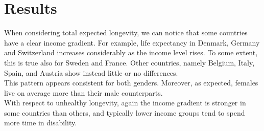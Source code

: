 





\section{Results}



When considering total expected longevity, we can notice that some countries have a clear income gradient. For example, life expectancy in Denmark, Germany and Switzerland increases considerably as the income level rises. To some extent, this is true also for Sweden and France. Other countries, namely Belgium, Italy, Spain, and Austria show instead little or no differences.\\
This pattern appears consistent for both genders. Moreover, as expected, females live on average more than their male counterparts.\\
With respect to unhealthy longevity, again the income gradient is stronger in some countries than others, and typically lower income groups tend to spend more time in disability. 









